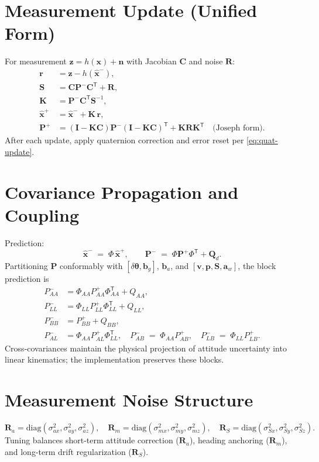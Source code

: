\documentclass[11pt]{article}
\newcommand{\vect}[1]{\bm{#1}}
\newcommand{\mat}[1]{\bm{#1}}
\newcommand{\T}{\mathsf{T}}
\newcommand{\I}{\mat{I}}
\begin{document}
\section{Measurement Update (Unified Form)}
\label{sec:meas-update}
For measurement \(\vect{z}=h(\vect{x})+\vect{n}\) with Jacobian \(\mat{C}\) and noise \(\mat{R}\):
\begin{align}
 \vect{r} &= \vect{z} - h(\hat{\vect{x}}^-), \label{eq:innov}\\
 \mat{S}  &= \mat{C}\mat{P}^- \mat{C}^{\T} + \mat{R}, \label{eq:S}\\
 \mat{K}  &= \mat{P}^- \mat{C}^{\T} \mat{S}^{-1}, \label{eq:K}\\
 \hat{\vect{x}}^+ &= \hat{\vect{x}}^- + \mat{K}\,\vect{r}, \label{eq:x-update}\\
 \mat{P}^+ &= (\I - \mat{K}\mat{C})\mat{P}^- (\I - \mat{K}\mat{C})^{\T} + \mat{K}\mat{R}\mat{K}^{\T} \quad \text{(Joseph form)}.
 \label{eq:joseph}
\end{align}
After each update, apply quaternion correction and error reset per \eqref{eq:quat-update}.

\section{Covariance Propagation and Coupling}
\label{sec:cov-prop}
Prediction:
\begin{equation}
  \hat{\vect{x}}^- \;=\; \Phi\,\hat{\vect{x}}^+,
  \qquad
  \mat{P}^- \;=\; \Phi \mat{P}^+ \Phi^{\T} + \mat{Q}_d.
  \label{eq:pred}
\end{equation}
Partitioning \( \mat{P} \) conformably with \([\delta\vect{\theta},\vect{b}_g]\),
\(\vect{b}_a\), and \([\vect{v},\vect{p},\vect{S},\vect{a}_w]\), the block prediction is
\begin{align}
  P_{AA}^- &= \Phi_{AA} P_{AA}^+ \Phi_{AA}^{\T} + Q_{AA}, \\
  P_{LL}^- &= \Phi_{LL} P_{LL}^+ \Phi_{LL}^{\T} + Q_{LL}, \\
  P_{BB}^- &= P_{BB}^+ + Q_{BB}, \\
  P_{AL}^- &= \Phi_{AA} P_{AL}^+ \Phi_{LL}^{\T}, \quad
  P_{AB}^- \;=\; \Phi_{AA} P_{AB}^+, \quad
  P_{LB}^- \;=\; \Phi_{LL} P_{LB}^+.
  \label{eq:block-prop}
\end{align}
Cross-covariances maintain the physical projection of attitude uncertainty into
linear kinematics; the implementation preserves these blocks.

\section{Measurement Noise Structure}
\label{sec:meas-noise}
\begin{equation}
  \mat{R}_a = \mathrm{diag}(\sigma_{ax}^2,\sigma_{ay}^2,\sigma_{az}^2),\quad
  \mat{R}_m = \mathrm{diag}(\sigma_{mx}^2,\sigma_{my}^2,\sigma_{mz}^2),\quad
  \mat{R}_S = \mathrm{diag}(\sigma_{Sx}^2,\sigma_{Sy}^2,\sigma_{Sz}^2).
  \label{eq:R-blocks}
\end{equation}
Tuning balances short-term attitude correction (\(\mat{R}_a\)), heading anchoring (\(\mat{R}_m\)),
and long-term drift regularization (\(\mat{R}_S\)).
\end{document}
